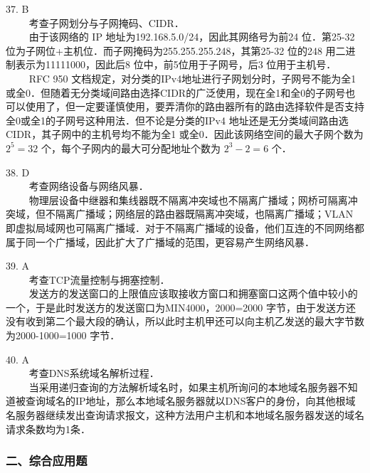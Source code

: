 37. B \\
$\qquad$ 考查子网划分与子网掩码、CIDR．\\
$\qquad$ 由于该网络的 IP 地址为192.168.5.0/24，因此其网络号为前24 位．第25-32 位为子网位+主机位．而子网掩码为255.255.255.248，其第25-32 位的248 用二进制表示为11111000，因此后8 位中，前5位用于子网号，后3 位用于主机号． \\
$\qquad$ RFC 950 文档规定，对分类的IPv4地址进行子网划分时，子网号不能为全1或全0．但随着无分类域间路由选择CIDR的广泛使用，现在全1和全0的子网号也可以使用了，但一定要谨慎使用，要弄清你的路由器所有的路由选择软件是否支持全0或全1的子网号这种用法．但不论是分类的IPv4 地址还是无分类域间路由选CIDR，其子网中的主机号均不能为全1 或全0．因此该网络空间的最大子网个数为 $2^5=32$ 个，每个子网内的最大可分配地址个数为 $2^3-2=6$ 个．

38. D \\
$\qquad$ 考查网络设备与网络风暴． \\
$\qquad$ 物理层设备中继器和集线器既不隔离冲突域也不隔离广播域；网桥可隔离冲突域，但不隔离广播域；网络层的路由器既隔离冲突域，也隔离广播域；VLAN 即虚拟局域网也可隔离广播域．对于不隔离广播域的设备，他们互连的不同网络都属于同一个广播域，因此扩大了广播域的范围，更容易产生网络风暴．

39. A \\
$\qquad$ 考查TCP流量控制与拥塞控制．\\
$\qquad$ 发送方的发送窗口的上限值应该取接收方窗口和拥塞窗口这两个值中较小的一个，于是此时发送方的发送窗口为MIN{4000，2000}=2000 字节，由于发送方还没有收到第二个最大段的确认，所以此时主机甲还可以向主机乙发送的最大字节数为2000-1000=1000 字节．

40. A \\
$\qquad$ 考查DNS系统域名解析过程．\\
$\qquad$ 当采用递归查询的方法解析域名时，如果主机所询问的本地域名服务器不知道被查询域名的IP地址，那么本地域名服务器就以DNS客户的身份，向其他根域名服务器继续发出查询请求报文，这种方法用户主机和本地域名服务器发送的域名请求条数均为1条．

\subsubsection{二、综合应用题}

